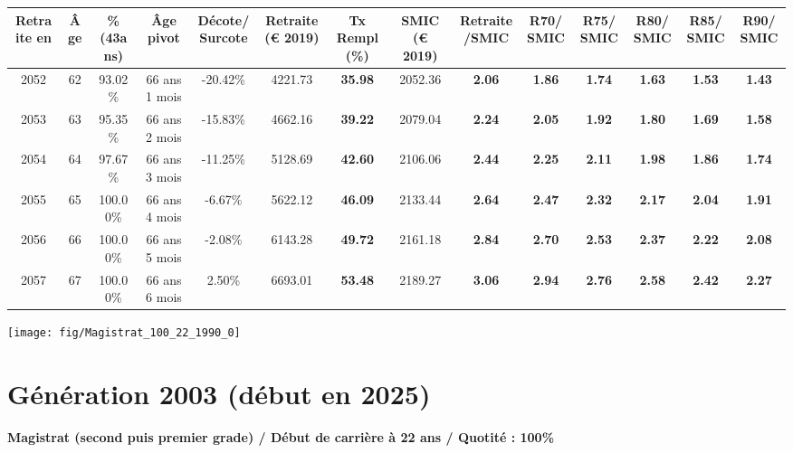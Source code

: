 \begin{adjustbox}{max width=\textwidth} 
\begin{tabular}[htb]{|c|c||c|c|c||c|c||c|c||c|c|c|c|c|} 
\hline 
 Retraite en &  Âge &  \%(43ans) &  Âge pivot &  Décote/Surcote &  Retraite (\euro{} 2019) &  Tx Rempl(\%) &  SMIC (\euro{} 2019) &  Retraite/SMIC &  R70/SMIC &  R75/SMIC &  R80/SMIC &  R85/SMIC &  R90/SMIC \\ 
\hline \hline 
 2052 &  62 &  93.02\% &  66 ans 1 mois &  -20.42\% &  4221.73 &  {\bf 35.98} &  2052.36 &  {\bf 2.06} &  {\bf 1.86} &  {\bf 1.74} &  {\bf 1.63} &  {\bf 1.53} &  {\bf 1.43} \\ 
\hline 
 2053 &  63 &  95.35\% &  66 ans 2 mois &  -15.83\% &  4662.16 &  {\bf 39.22} &  2079.04 &  {\bf 2.24} &  {\bf 2.05} &  {\bf 1.92} &  {\bf 1.80} &  {\bf 1.69} &  {\bf 1.58} \\ 
\hline 
 2054 &  64 &  97.67\% &  66 ans 3 mois &  -11.25\% &  5128.69 &  {\bf 42.60} &  2106.06 &  {\bf 2.44} &  {\bf 2.25} &  {\bf 2.11} &  {\bf 1.98} &  {\bf 1.86} &  {\bf 1.74} \\ 
\hline 
 2055 &  65 &  100.00\% &  66 ans 4 mois &  -6.67\% &  5622.12 &  {\bf 46.09} &  2133.44 &  {\bf 2.64} &  {\bf 2.47} &  {\bf 2.32} &  {\bf 2.17} &  {\bf 2.04} &  {\bf 1.91} \\ 
\hline 
 2056 &  66 &  100.00\% &  66 ans 5 mois &  -2.08\% &  6143.28 &  {\bf 49.72} &  2161.18 &  {\bf 2.84} &  {\bf 2.70} &  {\bf 2.53} &  {\bf 2.37} &  {\bf 2.22} &  {\bf 2.08} \\ 
\hline 
 2057 &  67 &  100.00\% &  66 ans 6 mois &  2.50\% &  6693.01 &  {\bf 53.48} &  2189.27 &  {\bf 3.06} &  {\bf 2.94} &  {\bf 2.76} &  {\bf 2.58} &  {\bf 2.42} &  {\bf 2.27} \\ 
\hline 
\hline 
\end{tabular} 
\end{adjustbox} 
 
 \vspace{0.1cm} 

 {\hspace{-2.2cm}\texttt{[image: fig/Magistrat\_100\_22\_1990\_0]}} 

\newpage 
 
\section{Génération 2003 (début en 2025)\label{Magistrat_100_22_2003_0}} 
 
{\bf \noindent Magistrat (second puis premier grade) / Début de carrière à 22 ans / Quotité : 100\%}  ~ 

